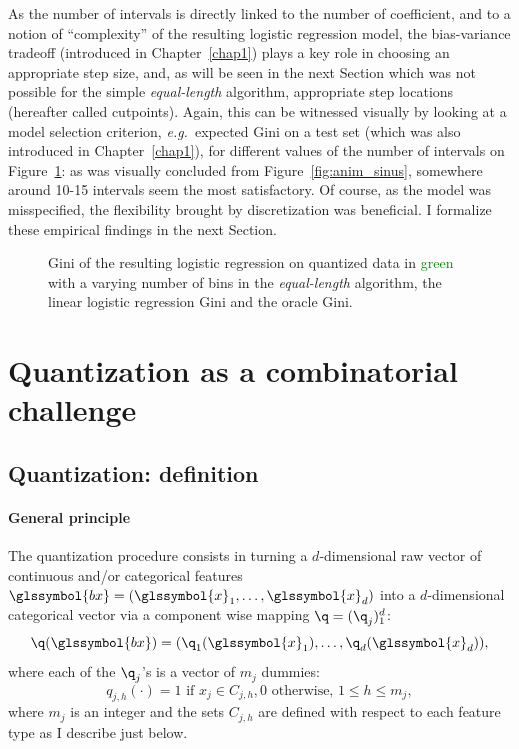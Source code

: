As the number of intervals is directly linked to the number of coefficient, and to a notion of ``complexity'' of the resulting logistic regression model, the bias-variance tradeoff (introduced in Chapter~\ref{chap1}) plays a key role in choosing an appropriate step size, and, as will be seen in the next Section which was not possible for the simple \textit{equal-length} algorithm, appropriate step locations (hereafter called cutpoints). Again, this can be witnessed visually by looking at a model selection criterion, \textit{e.g.}\ expected Gini on a test set (which was also introduced in Chapter~\ref{chap1}), for different values of the number of intervals on Figure~\ref{fig:bic_sin}: as was visually concluded from Figure~\ref{fig:anim_sinus}, somewhere around 10-15 intervals seem the most satisfactory. Of course, as the model was misspecified, the flexibility brought by discretization was beneficial. 
I formalize these empirical findings in the next Section.



\begin{figure}[!ht]
\resizebox{\textwidth}{7cm}{}
\caption{\label{fig:bic_sin} Gini of the resulting logistic regression on quantized data in \textcolor{green}{green} with a varying number of bins in the \textit{equal-length} algorithm, the linear logistic regression Gini and the oracle Gini.}
\end{figure}


 
\section{Quantization as a combinatorial challenge} \label{sec:model_selection}

\subsection{Quantization: definition}

\paragraph{General principle}

The quantization procedure consists in turning a $d$-dimensional raw vector of continuous and/or categorical features $\glssymbol{bx} = (\glssymbol{x}_1, \ldots, \glssymbol{x}_d)$ into a $d$-dimensional categorical vector via a component wise mapping $\q=(\q_j)_1^d$:
\[\q(\glssymbol{bx})=(\q_1(\glssymbol{x}_1),\ldots,\q_d(\glssymbol{x}_d)),\]
where each of the $\q_j$'s is a vector of $m_j$ dummies: 
\begin{equation}\label{eq:qj}
q_{j,h}(\cdot) =  1 \text{ if } x_j \in C_{j,h}, 0 \text{ otherwise, } 1 \leq h \leq m_j,
\end{equation}
where $m_j$ is an integer and the sets $C_{j,h}$ are defined with respect to each feature type as I describe just below.
